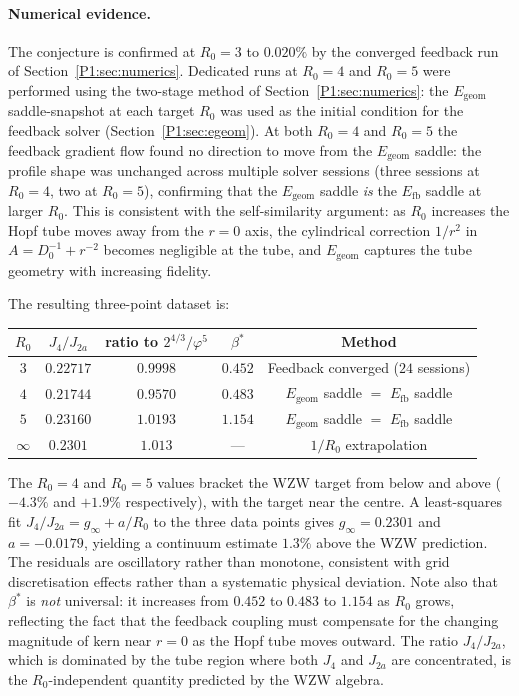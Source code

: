 \documentclass[11pt,a4paper]{article}
\theoremstyle{definition}
\theoremstyle{remark}
\newcommand{\vp}{\varphi}
\newcommand{\bst}{\beta^{*}}
\newcommand{\Ja}{J_{2a}}
\newcommand{\Jfour}{J_{4}}
\begin{document}
\paragraph{Numerical evidence.}
The conjecture is confirmed at $R_0=3$ to $0.020\%$ by the
converged feedback run of Section~\ref{P1:sec:numerics}.
Dedicated runs at $R_0=4$ and $R_0=5$ were performed using
the two-stage method of Section~\ref{P1:sec:numerics}: the
$E_{\mathrm{geom}}$ saddle-snapshot at each target $R_0$
was used as the initial condition for the feedback solver
(Section~\ref{P1:sec:egeom}).
At both $R_0=4$ and $R_0=5$ the feedback gradient flow found
no direction to move from the $E_{\mathrm{geom}}$ saddle:
the profile shape was unchanged across multiple solver sessions
(three sessions at $R_0=4$, two at $R_0=5$), confirming that
the $E_{\mathrm{geom}}$ saddle \emph{is} the $E_{\mathrm{fb}}$
saddle at larger $R_0$.
This is consistent with the self-similarity argument:
as $R_0$ increases the Hopf tube moves away from the $r=0$
axis, the cylindrical correction $1/r^2$ in $A = D_0^{-1}+r^{-2}$
becomes negligible at the tube, and $E_{\mathrm{geom}}$ captures
the tube geometry with increasing fidelity.

The resulting three-point dataset is:

\begin{center}
\renewcommand{\arraystretch}{1.2}
\begin{tabular}{ccccc}
\toprule
$R_0$ & $\Jfour/\Ja$ & ratio to $2^{4/3}/\vp^5$ & $\bst$ & Method \\
\midrule
$3$ & $0.22717$ & $0.9998$ & $0.452$ & Feedback converged ($24$ sessions) \\
$4$ & $0.21744$ & $0.9570$ & $0.483$ & $E_{\mathrm{geom}}$ saddle $=$ $E_{\mathrm{fb}}$ saddle \\
$5$ & $0.23160$ & $1.0193$ & $1.154$ & $E_{\mathrm{geom}}$ saddle $=$ $E_{\mathrm{fb}}$ saddle \\
\midrule
$\infty$ & $0.2301$ & $1.013$ & --- & $1/R_0$ extrapolation \\
\bottomrule
\end{tabular}
\end{center}

The $R_0=4$ and $R_0=5$ values bracket the WZW target from below
and above ($-4.3\%$ and $+1.9\%$ respectively), with the target
near the centre.
A least-squares fit $\Jfour/\Ja = g_\infty + a/R_0$ to the three
data points gives $g_\infty = 0.2301$ and $a = -0.0179$,
yielding a continuum estimate $1.3\%$ above the WZW prediction.
The residuals are oscillatory rather than monotone, consistent
with grid discretisation effects rather than a systematic
physical deviation.
Note also that $\bst$ is \emph{not} universal: it increases
from $0.452$ to $0.483$ to $1.154$ as $R_0$ grows, reflecting
the fact that the feedback coupling must compensate for the
changing magnitude of $\mathrm{kern}$ near $r=0$ as the Hopf
tube moves outward.
The ratio $\Jfour/\Ja$, which is dominated by the tube region
where both $J_4$ and $J_{2a}$ are concentrated, is the
$R_0$-independent quantity predicted by the WZW algebra.
\end{document}
